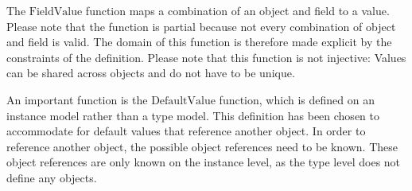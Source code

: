 The $\mathrm{FieldValue}$ function maps a combination of an object and field to a value. Please note that the function is partial because not every combination of object and field is valid. The domain of this function is therefore made explicit by the constraints of the definition. Please note that this function is not injective: Values can be shared across objects and do not have to be unique.

An important function is the $\mathrm{DefaultValue}$ function, which is defined on an instance model rather than a type model. This definition has been chosen to accommodate for default values that reference another object. In order to reference another object, the possible object references need to be known. These object references are only known on the instance level, as the type level does not define any objects.

